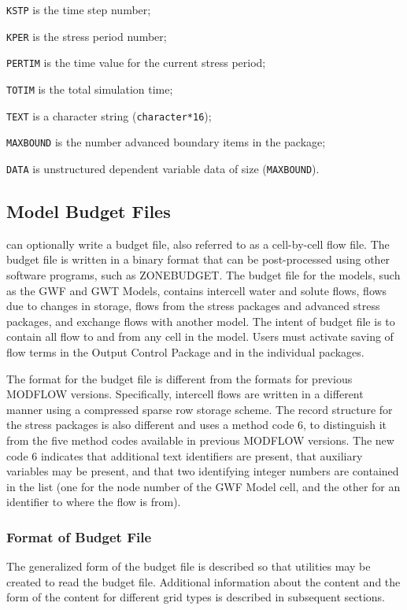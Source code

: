 \begin{description} \itemsep0pt \parskip0pt 
\item \texttt{KSTP} is the time step number;
\item \texttt{KPER} is the stress period number;
\item \texttt{PERTIM} is the time value for the current stress period; 
\item \texttt{TOTIM} is the total simulation time;
\item \texttt{TEXT} is a character string (\texttt{character*16});
\item \texttt{MAXBOUND} is the number advanced boundary items in the package;
\item \texttt{DATA} is unstructured dependent variable data of size (\texttt{MAXBOUND}).
\end{description}


\newpage
\subsection{Model Budget Files}
\mf can optionally write a budget file, also referred to as a cell-by-cell flow file.  The budget file is written in a binary format that can be post-processed using other software programs, such as ZONEBUDGET.  The budget file for the \mf models, such as the GWF and GWT Models, contains intercell water and solute flows, flows due to changes in storage, flows from the stress packages and advanced stress packages, and exchange flows with another model.  The intent of budget file is to contain all flow to and from any cell in the model.  Users must activate saving of flow terms in the Output Control Package and in the individual packages.  

The format for the budget file is different from the formats for previous MODFLOW versions.  Specifically, intercell flows are written in a different manner using a compressed sparse row storage scheme.  The record structure for the stress packages is also different and uses a method code 6, to distinguish it from the five method codes available in previous MODFLOW versions.  The new code 6 indicates that additional text identifiers are present, that auxiliary variables may be present, and that two identifying integer numbers are contained in the list (one for the node number of the GWF Model cell, and the other for an identifier to where the flow is from).  

\subsubsection{Format of Budget File}
The generalized form of the budget file is described so that utilities may be created to read the budget file.  Additional information about the content and the form of the content for different grid types is described in subsequent sections.

